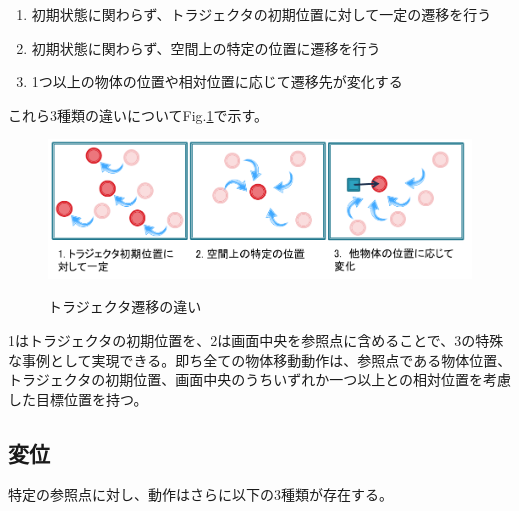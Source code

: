 	\begin{enumerate}
		\item 初期状態に関わらず、トラジェクタの初期位置に対して一定の遷移を行う
		\item 初期状態に関わらず、空間上の特定の位置に遷移を行う
		\item 1つ以上の物体の位置や相対位置に応じて遷移先が変化する
	\end{enumerate}
これら3種類の違いについてFig.\ref{figure:moving_trajector}で示す。
	\begin{figure}[h]
		\begin{center}
			\includegraphics[width=14cm]{figure1.png} \\ %
			\caption{トラジェクタ遷移の違い}
			\label{figure:moving_trajector}
		\end{center}
	\end{figure}
1はトラジェクタの初期位置を、2は画面中央を参照点に含めることで、3の特殊な事例として実現できる。即ち全ての物体移動動作は、参照点である物体位置、トラジェクタの初期位置、画面中央のうちいずれか一つ以上との相対位置を考慮した目標位置を持つ。

\subsection{変位}

特定の参照点に対し、動作はさらに以下の3種類が存在する。

